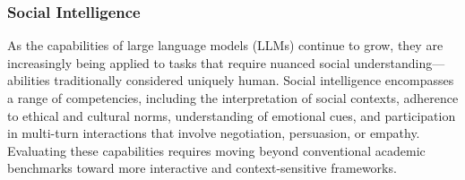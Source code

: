 
\subsubsection{\textbf{Social Intelligence}}
As the capabilities of large language models (LLMs) continue to grow, they are increasingly being applied to tasks that require nuanced social understanding—abilities traditionally considered uniquely human. Social intelligence encompasses a range of competencies, including the interpretation of social contexts, adherence to ethical and cultural norms, understanding of emotional cues, and participation in multi-turn interactions that involve negotiation, persuasion, or empathy. Evaluating these capabilities requires moving beyond conventional academic benchmarks toward more interactive and context-sensitive frameworks.

